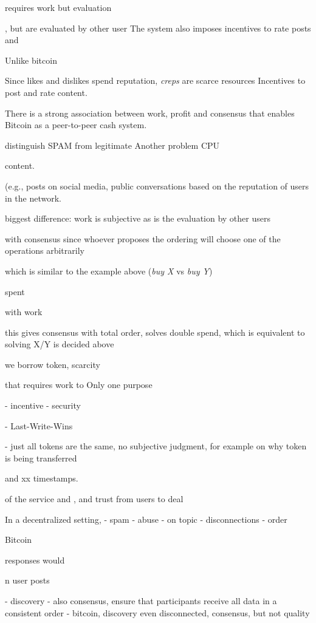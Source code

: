 \documentclass[10pt,journal,compsoc]{IEEEtran}
\begin{document}
requires work but evaluation


, but
are evaluated by other user
The system also imposes incentives to rate posts and 

Unlike bitcoin

Since likes and dislikes spend reputation, \emph{creps} are scarce resources
Incentives to post and rate content.

There is a strong association between work, profit and consensus that enables
Bitcoin as a peer-to-peer cash system.

distinguish SPAM from legitimate
Another problem CPU



content.



 (e.g., posts on social media, public conversations
based on the reputation of users
in the network.


biggest difference:
work is subjective as is the evaluation by other users


 with consensus since
whoever proposes the ordering will choose one of the operations arbitrarily


 which is similar to the
example above (\emph{buy X} vs \emph{buy Y})

spent

with work



this gives consensus with total order, solves double spend, which is equivalent
to solving X/Y is decided above

we borrow token, scarcity


 that requires work to 
Only one purpose


- incentive
- security

- Last-Write-Wins

- just all tokens are the same, no subjective judgment, for example on why token is being transferred


 and xx timestamps.


 of the service and , and trust from users to deal

In a decentralized setting, 
    - spam
    - abuse
    - on topic
    - disconnections
    - order

Bitcoin

responses would




n user posts 

- discovery
- also consensus, ensure that participants receive all data in a consistent order
- bitcoin, discovery even disconnected, consensus, but not quality
\end{document}
